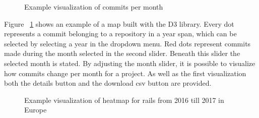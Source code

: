 \documentclass[acmtog, authorversion]{acmart}
\begin{document}
\begin{figure}
\center
{}
\caption{Example visualization of commits per month}
\label{fig:commits-period}
\end{figure}

Figure ~\ref{fig:commits-period} shows an example of a map built with the D3 library.
Every dot represents a commit belonging to a repository in a year span, which can be selected by selecting a year in the dropdown menu.
Red dots represent commits made during the month selected in the second slider.
Beneath this slider the selected month is stated.
By adjusting the month slider, it is possible to visualize how commits change per month for a project.
As well as the first visualization both the details button and the download csv button are provided.

\begin{figure}
\center
{}
\caption{Example visualization of heatmap for rails from 2016 till 2017 in Europe}
\label{fig:commits-heatmap}
\end{figure}
\end{document}
